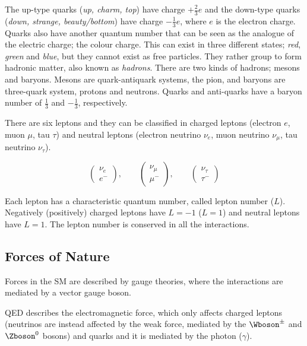 			\noindent The up-type quarks (\textit{up, charm, top}) have charge $+\frac{2}{3}e$ and the down-type quarks (\textit{down, strange, beauty/bottom}) have charge $-\frac{1}{3}e$, where $e$ is the electron charge. Quarks also have another quantum number that can be seen as the analogue of the electric charge; the colour charge. This can exist in three different states; \textit{red}, \textit{green} and \textit{blue}, but they cannot exist as free particles. They rather group to form hadronic matter, also known as \emph{hadrons}. There are two kinds of hadrons; mesons and baryons. Mesons are quark-antiquark systems, \eg the pion, and baryons are three-quark system, \eg protons and neutrons. Quarks and anti-quarks have a baryon number of $\frac{1}{3}$ and $-\frac{1}{3}$, respectively.

			There are six leptons and they can be classified in charged leptons (electron $e$, muon $\mu$, tau $\tau$) and neutral leptons (electron neutrino $\nu_e$, muon neutrino $\nu_{\mu}$, tau neutrino $\nu_{\tau}$).
			
			\begin{equation*}
			\label{eq:lepton_flavor_doublets}
				\begin{pmatrix} \nu_e      \\ e^-    \end{pmatrix}, \qquad
				\begin{pmatrix} \nu_{\mu}  \\ \mu^-  \end{pmatrix}, \qquad
				\begin{pmatrix} \nu_{\tau} \\ \tau^- \end{pmatrix}
			\end{equation*}

			\noindent Each lepton has a characteristic quantum number, called lepton number ($L$). Negatively (positively) charged leptons have $L=-1$ ($L=1$) and neutral leptons have $L=1$. The lepton number is conserved in all the interactions. 



		\subsection*{Forces of Nature}

			Forces in the \ac{SM} are described by gauge theories, where the interactions are mediated by a vector gauge boson. 

			\ac{QED} describes the electromagnetic force, which only affects charged leptons (neutrinos are instead affected by the weak force, mediated by the $\Wboson^{\pm}$ and $\Zboson^0$ bosons) and quarks and it is mediated by the photon ($\gamma$).

